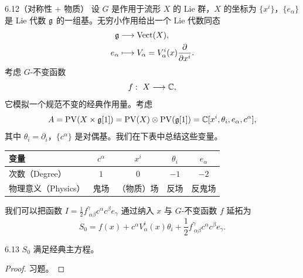 \begin{wexam}{6.12}（对称性 $+$ 物质）
设 $G$ 是作用于流形 $X$ 的 Lie 群，$X$ 的坐标为 $\{x^i\}$，$\{e_\alpha\}$ 是
Lie 代数 $\mathfrak{g}$ 的一组基。无穷小作用给出一个 Lie 代数同态
\[
  \begin{aligned}
    \mathfrak{g}&\longrightarrow\operatorname{Vect}(X),\\
    e_\alpha&\longmapsto V_\alpha
    =V^i_\alpha(x)\frac{\partial}{\partial x^i}.
  \end{aligned}
\]
考虑 $G$-不变函数
\[
  f:\ X\longrightarrow\mathbb{C},
\]
它模拟一个规范不变的经典作用量。考虑
\[
  A=\mathrm{PV}(X\times\mathfrak{g}[1])=\mathrm{PV}(X)\otimes\mathrm{PV}(\mathfrak{g}[1])
  =\mathbb{C}[x^i,\theta_i,e_\alpha,c^\alpha],
\]
其中 $\theta_i=\partial_i$，$\{c^\alpha\}$ 是对偶基。我们在下表中总结这些变量。

\begin{center}
\normalfont\small
\begin{tabular}{lcccc}
  \toprule
  变量 & $c^\alpha$ & $x^i$ & $\theta_i$ & $e_\alpha$ \\
  \midrule
  次数（Degree） & $1$ & $0$ & $-1$ & $-2$ \\
  物理意义（Physics） & 鬼场 & （物质）场 & 反场 & 反鬼场 \\
  \bottomrule
\end{tabular}
\end{center}

我们可以把函数 $I=\frac{1}{2}f^{\gamma}_{\ \alpha\beta}c^\alpha c^\beta e_\gamma$
通过纳入 $x$ 与 $G$-不变函数 $f$ 延拓为
\[
  S_0=f(x)+c^\alpha V^i_\alpha(x)\theta_i
  +\frac{1}{2}f^{\gamma}_{\ \alpha\beta}c^\alpha c^\beta e_\gamma.
\]
\end{wexam}

\begin{wprop}{6.13}
$S_0$ 满足经典主方程。
\end{wprop}

\begin{proof}
习题。
\end{proof}


